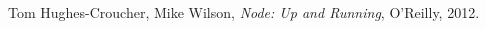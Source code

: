 \begin{thebibliography}{99}

Tom Hughes-Croucher, Mike Wilson, \textit{Node: Up and Running}, O'Reilly, 2012.

\end{thebibliography}
